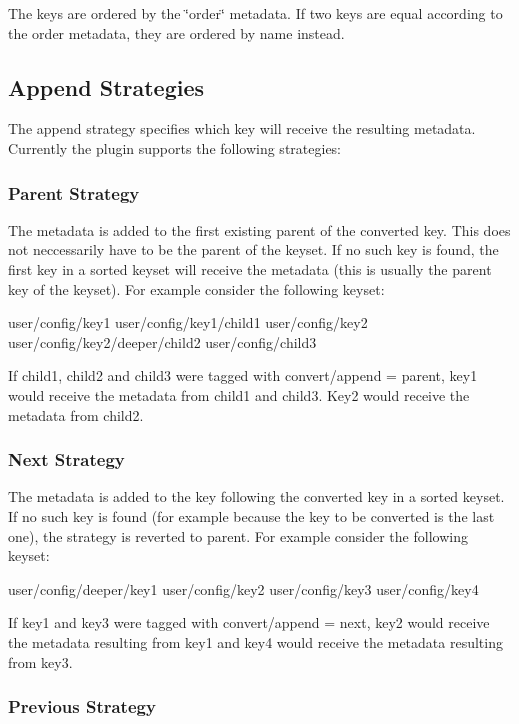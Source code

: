The keys are ordered by the \char`\"{}order\char`\"{} metadata. If two keys are equal according to the order metadata, they are ordered by name instead.

\subsection*{Append Strategies}

The append strategy specifies which key will receive the resulting metadata. Currently the plugin supports the following strategies\+:

\subsubsection*{Parent Strategy}

The metadata is added to the first existing parent of the converted key. This does not neccessarily have to be the parent of the keyset. If no such key is found, the first key in a sorted keyset will receive the metadata (this is usually the parent key of the keyset). For example consider the following keyset\+: \begin{DoxyVerb}user/config/key1
user/config/key1/child1
user/config/key2
user/config/key2/deeper/child2
user/config/child3
\end{DoxyVerb}


If child1, child2 and child3 were tagged with {\ttfamily convert/append = parent}, key1 would receive the metadata from child1 and child3. Key2 would receive the metadata from child2.

\subsubsection*{Next Strategy}

The metadata is added to the key following the converted key in a sorted keyset. If no such key is found (for example because the key to be converted is the last one), the strategy is reverted to parent. For example consider the following keyset\+: \begin{DoxyVerb}user/config/deeper/key1
user/config/key2
user/config/key3
user/config/key4
\end{DoxyVerb}


If key1 and key3 were tagged with {\ttfamily convert/append = next}, key2 would receive the metadata resulting from key1 and key4 would receive the metadata resulting from key3.

\subsubsection*{Previous Strategy}

